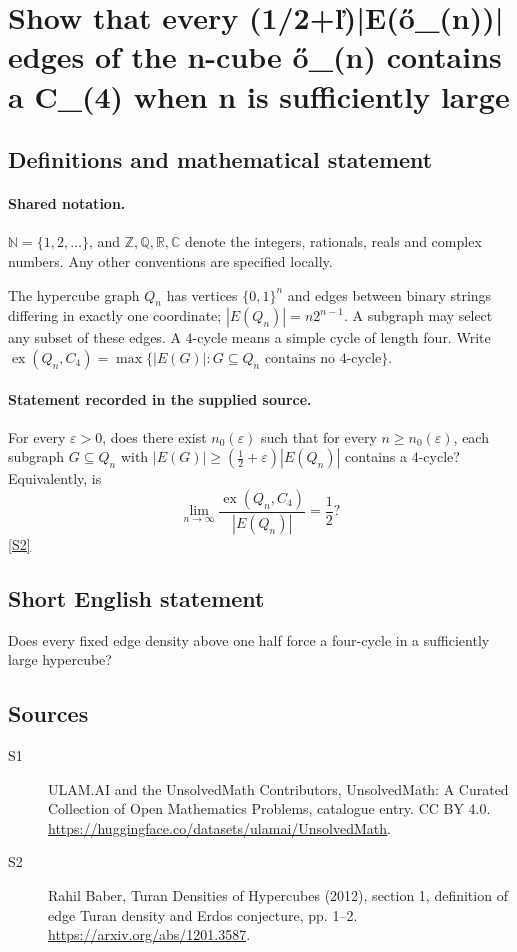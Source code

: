 \documentclass[11pt]{article}
\newcommand{\sref}[2]{\hyperlink{source:#1:#2}{[S#2]}}
\begin{document}
\section{Show that every (1/2+ľ)|E(ő\_(n))| edges of the n-cube ő\_(n) contains a C\_(4) when n is sufficiently large}\label{statement}

\subsection{Definitions and mathematical statement}

\paragraph{Shared notation.}$\mathbb N=\{1,2,\ldots\}$, and $\mathbb Z,\mathbb Q,\mathbb R,\mathbb C$ denote the integers, rationals, reals and complex numbers. Any other conventions are specified locally.


The hypercube graph $Q_n$ has vertices $\{0,1\}^n$ and edges between binary strings differing in exactly one coordinate; $|E(Q_n)|=n2^{n-1}$. A subgraph may select any subset of these edges. A $4$-cycle means a simple cycle of length four. Write $\operatorname{ex}(Q_n,C_4)=\max\{|E(G)|:G\subseteq Q_n\text{ contains no }4\text{-cycle}\}$.
\paragraph{Statement recorded in the supplied source.}
For every $\varepsilon>0$, does there exist $n_0(\varepsilon)$ such that for every $n\geq n_0(\varepsilon)$, each subgraph $G\subseteq Q_n$ with $|E(G)|\geq(\tfrac12+\varepsilon)|E(Q_n)|$ contains a $4$-cycle? Equivalently, is
\[\lim_{n\to\infty}\frac{\operatorname{ex}(Q_n,C_4)}{|E(Q_n)|}=\frac12?\] \sref{statement}{2}
\subsection{Short English statement}
Does every fixed edge density above one half force a four-cycle in a sufficiently large hypercube?
\subsection{Sources}
\begin{description}
\item[\hypertarget{source:statement:1}{S1}] ULAM.AI and the UnsolvedMath Contributors, UnsolvedMath: A Curated Collection of Open Mathematics Problems, catalogue entry. CC BY 4.0. \url{https://huggingface.co/datasets/ulamai/UnsolvedMath}.
\item[\hypertarget{source:statement:2}{S2}] Rahil Baber, Turan Densities of Hypercubes (2012), section 1, definition of edge Turan density and Erdos conjecture, pp. 1--2. \url{https://arxiv.org/abs/1201.3587}.
\end{description}
\label{end:statement}
\end{document}
